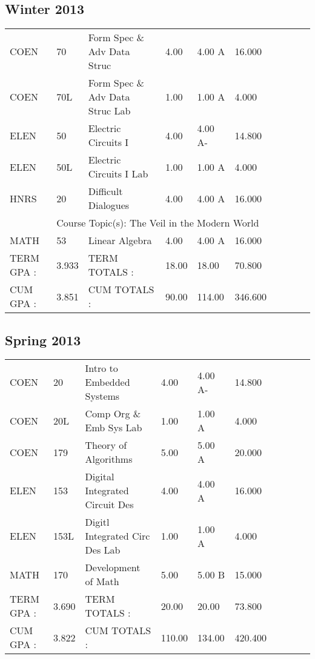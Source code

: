 \documentclass{scrartcl}\usepackage[T1]{fontenc}
\begin{document}
\subsection{Winter 2013}
\begin{tabular}{ l  l  l  l  l  l  l  l  l  l }
COEN&70&Form Spec \& Adv Data Struc&4.00&4.00 A&16.000& & & & \\
COEN&70L&Form Spec \& Adv Data Struc Lab&1.00&1.00 A&4.000& & & & \\
ELEN&50&Electric Circuits I&4.00&4.00 A-&14.800& & & & \\
ELEN&50L&Electric Circuits I Lab&1.00&1.00 A&4.000& & & & \\
HNRS&20&Difficult Dialogues&4.00&4.00 A&16.000& & & & \\
\multicolumn{1}{l}{ }
&
\multicolumn{9}{l}{Course Topic(s): The Veil in the Modern World}
\\
MATH&53&Linear Algebra&4.00&4.00 A&16.000& & & & \\
\hline
TERM GPA :&3.933&TERM TOTALS :&18.00&18.00&70.800& & & & \\
CUM GPA :&3.851&CUM TOTALS :&90.00&114.00&346.600& & & & \\\end{tabular}
\subsection{Spring 2013}
\begin{tabular}{ l  l  l  l  l  l  l  l  l  l }
COEN&20&Intro to Embedded Systems&4.00&4.00 A-&14.800& & & & \\
COEN&20L&Comp Org \& Emb Sys Lab&1.00&1.00 A&4.000& & & & \\
COEN&179&Theory of Algorithms&5.00&5.00 A&20.000& & & & \\
ELEN&153&Digital Integrated Circuit Des&4.00&4.00 A&16.000& & & & \\
ELEN&153L&Digitl Integrated Circ Des Lab&1.00&1.00 A&4.000& & & & \\
MATH&170&Development of Math&5.00&5.00 B&15.000& & & & \\
\hline
TERM GPA :&3.690&TERM TOTALS :&20.00&20.00&73.800& & & & \\
CUM GPA :&3.822&CUM TOTALS :&110.00&134.00&420.400& & & & \\\end{tabular}
\end{document}
